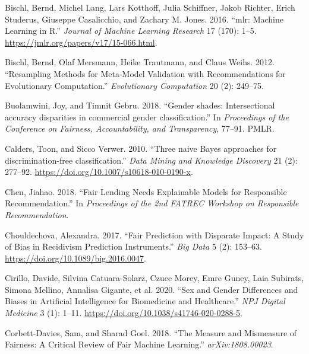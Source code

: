 \begin{CSLReferences}{1}{0}
\leavevmode{}%
Bischl, Bernd, Michel Lang, Lars Kotthoff, Julia Schiffner, Jakob Richter, Erich Studerus, Giuseppe Casalicchio, and Zachary M. Jones. 2016. {``{mlr}: Machine Learning in {R}.''} \emph{Journal of Machine Learning Research} 17 (170): 1--5. \url{https://jmlr.org/papers/v17/15-066.html}.

\leavevmode{}%
Bischl, Bernd, Olaf Mersmann, Heike Trautmann, and Claus Weihs. 2012. {``Resampling Methods for Meta-Model Validation with Recommendations for Evolutionary Computation.''} \emph{Evolutionary Computation} 20 (2): 249--75.

\leavevmode{}%
Buolamwini, Joy, and Timnit Gebru. 2018. {``{Gender shades: Intersectional accuracy disparities in commercial gender classification}.''} In \emph{Proceedings of the Conference on Fairness, Accountability, and Transparency}, 77--91. PMLR.

\leavevmode{}%
Calders, Toon, and Sicco Verwer. 2010. {``{Three naive Bayes approaches for discrimination-free classification}.''} \emph{Data Mining and Knowledge Discovery} 21 (2): 277--92. \url{https://doi.org/10.1007/s10618-010-0190-x}.

\leavevmode{}%
Chen, Jiahao. 2018. {``Fair Lending Needs Explainable Models for Responsible Recommendation.''} In \emph{Proceedings of the 2nd FATREC Workshop on Responsible Recommendation}.

\leavevmode{}%
Chouldechova, Alexandra. 2017. {``Fair Prediction with Disparate Impact: A Study of Bias in Recidivism Prediction Instruments.''} \emph{Big Data} 5 (2): 153--63. \url{https://doi.org/10.1089/big.2016.0047}.

\leavevmode{}%
Cirillo, Davide, Silvina Catuara-Solarz, Czuee Morey, Emre Guney, Laia Subirats, Simona Mellino, Annalisa Gigante, et al. 2020. {``Sex and Gender Differences and Biases in Artificial Intelligence for Biomedicine and Healthcare.''} \emph{NPJ Digital Medicine} 3 (1): 1--11. \url{https://doi.org/10.1038/s41746-020-0288-5}.

\leavevmode{}%
Corbett-Davies, Sam, and Sharad Goel. 2018. {``The Measure and Mismeasure of Fairness: A Critical Review of Fair Machine Learning.''} \emph{arXiv:1808.00023}.


\end{CSLReferences}
